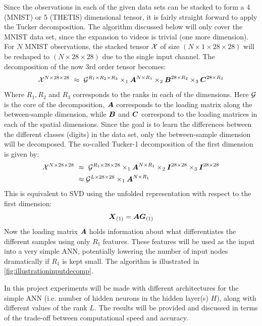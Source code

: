 Since the observations in each of the given data sets can be stacked to form a 4 (MNIST) or 5 (THETIS) dimensional tensor, it is fairly straight forward to apply the Tucker decomposition. The algorithm discussed below will only cover the MNIST data set, since the expansion to videos is trivial (one more dimension). For $N$ MNIST observations, the stacked tensor $\mathcal{X}$ of size $(N \times 1 \times 28 \times 28)$ will be reshaped to $(N\times 28 \times 28)$ due to the single input channel. The decomposition of the now 3rd order tensor becomes:
\begin{equation}
    \mathcal{X}^{N\times 28 \times 28} \ \approx \  \mathcal{G}^{R_1\times R_2 \times R_3} \times_1 \boldsymbol{A}^{N\times R_1} \times_2 \boldsymbol{B}^{28 \times R_2} \times_3 \boldsymbol{C}^{28 \times R_3}
\end{equation}
Where $R_1, R_2$ and $R_3$ corresponds to the ranks in each of the dimensions. Here $\mathcal{G}$ is the core of the decomposition, $\boldsymbol{A}$ corresponds to the loading matrix along the between-sample dimension, while $\boldsymbol{B}$ and $\boldsymbol{C}$ correspond to the loading matrices in each of the spatial dimensions. Since the goal is to learn the differences between the different classes (digits) in the data set, only the between-sample dimension will be decomposed. The so-called Tucker-1 decomposition of the first dimension is given by:
\begin{align}
    \mathcal{X}^{N\times 28 \times 28} \ &\approx \  \mathcal{G}^{R_1\times 28 \times 28} \times_1 \boldsymbol{A}^{N\times R_1} \times_2 \boldsymbol{I}^{28 \times 28} \times_3 \boldsymbol{I}^{28 \times 28} \\
    &\approx \mathcal{G}^{L\times 28 \times 28} \times_1 \boldsymbol{A}^{N\times R_1}
\end{align}
This is equivalent to SVD using the unfolded representation with respect to the first dimension:
\begin{equation}
    \boldsymbol{X}_{(1)} = \boldsymbol{A} \boldsymbol{G}_{(1)}
    \label{eq:tuckerMNISTinput}
\end{equation}
Now the loading matrix $\boldsymbol{A}$ holds information about what differentiates the different samples using only $R_1$ features. These features will be used as the input into a very simple ANN, potentially lowering the number of input nodes dramatically if $R_1$ is kept small. The algorithm is illustrated in \autoref{fig:illustrationinputdecomp}.

In this project experiments will be made with different architectures for the simple ANN (i.e. number of hidden neurons in the hidden layer(s) $H$), along with different values of the rank $L$. The results will be provided and discussed in terms of the trade-off between computational speed and accuracy.

